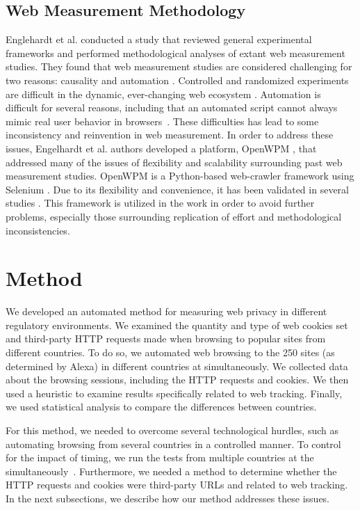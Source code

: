 \documentclass[conference]{IEEEtran}
\begin{document}
\subsection{Web Measurement Methodology}

Englehardt et al. conducted a study that reviewed general experimental frameworks and performed methodological analyses of extant web measurement studies.  They found that web measurement studies are considered challenging for two reasons: causality and automation \cite{openwpm_article}.  Controlled and randomized experiments are difficult in the dynamic, ever-changing web ecosystem \cite{guha2010challenges}. Automation is difficult for several reasons, including that an automated script cannot always mimic real user behavior in browsers~\cite{openwpm_article}.  These difficulties has lead to some inconsistency and reinvention in web measurement. In order to address these issues, Engelhardt et al. authors developed a platform, OpenWPM \cite{openwpm}, that addressed many of the issues of flexibility and scalability surrounding past web measurement studies. 
OpenWPM is a Python-based web-crawler framework using Selenium \cite{Selenium}. Due to its flexibility and convenience, it has been validated in several studies \cite{openwpm}\cite{openwpm_article}. This framework is utilized in the work in order to avoid further problems, especially those surrounding replication of effort and methodological inconsistencies.

\section{Method}

We developed an automated method for measuring web privacy in different regulatory environments.  We examined the quantity and type of web cookies set and third-party HTTP requests made when browsing to popular sites from different countries.  To do so, we automated web browsing to the 250 sites (as determined by Alexa) in different countries at  simultaneously.  We collected data about the browsing sessions, including the HTTP requests and cookies.  We then used a heuristic to examine results specifically related to web tracking.  Finally, we used statistical analysis to compare the differences between countries.  

For this method, we needed to overcome several technological hurdles, such as automating browsing from several countries in a controlled manner. To control for the impact of timing, we run the tests from multiple countries at the simultaneously~\cite{guha2010challenges}. Furthermore, we needed a method to determine whether the HTTP requests and cookies were third-party URLs and related to web tracking. In the next subsections, we describe how our method addresses these issues.
\end{document}
